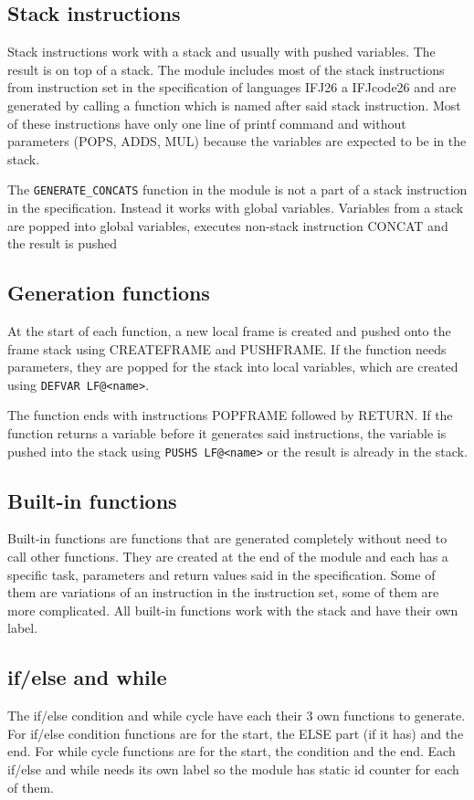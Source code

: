 \documentclass[12pt,a4paper]{article}
\begin{document}
\subsection{Stack instructions}
Stack instructions work with a stack and usually with pushed variables. The result is on top of a stack.
The module includes most of the stack instructions from instruction set in the specification of
languages IFJ26 a IFJcode26 and are generated by calling a function which is named after said stack
instruction. Most of these instructions have only one line of printf command and without parameters
(POPS, ADDS, MUL) because the variables are expected to be in the stack.

The \texttt{GENERATE\_CONCATS} function in the module is not a part of a stack instruction in the
specification. Instead it works with global variables. Variables from a stack are popped into global
variables, executes non-stack instruction CONCAT and the result is pushed 

\subsection{Generation functions}
At the start of each function, a new local frame is created and pushed onto the frame stack using
CREATEFRAME and PUSHFRAME. If the function needs parameters, they are popped for the stack into
local variables, which are created using \texttt{DEFVAR LF@<name>}.

The function ends with instructions POPFRAME followed by RETURN. If the function returns a variable
before it generates said instructions, the variable is pushed into the stack using \texttt{PUSHS LF@<name>}
or the result is already in the stack.

\subsection{Built-in functions}
Built-in functions are functions that are generated completely without need to call other functions.
They are created at the end of the module and each has a specific task, parameters and return values
said in the specification. Some of them are variations of an instruction in the instruction set, some of
them are more complicated. All built-in functions work with the stack and have their own label.

\subsection{if/else and while}
The if/else condition and while cycle have each their 3 own functions to generate. For if/else
condition functions are for the start, the ELSE part (if it has) and the end. For while cycle functions are
for the start, the condition and the end. Each if/else and while needs its own label so the module has
static id counter for each of them.
\end{document}
